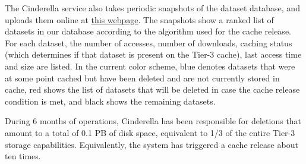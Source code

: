 The Cinderella service also takes periodic snapshots of the dataset database, and uploads them online at 
\href{http://t3serv001.mit.edu/~cmsprod/dynamicdata/cinderella.html}{\textcolor{Mahogany}{this webpage}}.
The snapshots show a ranked list of datasets in our database according to the algorithm used for the
cache release. For each dataset, the number of accesses, number of downloads, caching status (which 
determines if that dataset is present on the Tier-3 cache), last access time and size are listed.
In the current color scheme, blue denotes datasets that were at some point cached but have been deleted and
are not currently stored in cache, red shows the list of datasets that will be deleted in case the cache release
condition is met, and black shows the remaining datasets.

During 6 months of operations, Cinderella has been responsible for deletions that amount to a total of 0.1 PB
of disk space, equivalent to 1/3 of the entire Tier-3 storage capabilities. Equivalently, the system has 
triggered a cache release about ten times.

